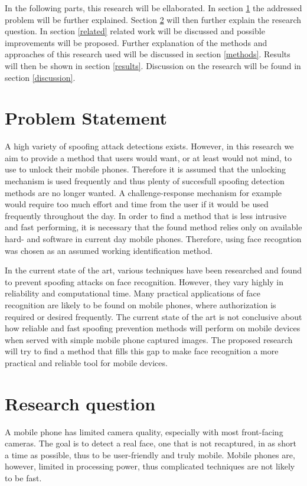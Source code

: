 \documentclass{sig-alternate-br}
\begin{document}
In the following parts, this research will be ellaborated. In section \ref{problem} the addressed problem will be further explained. Section \ref{question} will then further explain the research question. In section \ref{related} related work will be discussed and possible improvements will be proposed. Further explanation of the methods and approaches of this research used will be discussed in section \ref{methods}. Results will then be shown in section \ref{results}. Discussion on the research will be found in section \ref{discussion}.

\section{Problem Statement} \label{problem}
A high variety of spoofing attack detections exists. However, in this research we aim to provide a method that users would want, or at least would not mind, to use to unlock their mobile phones. Therefore it is assumed that the unlocking mechanism is used frequently and thus plenty of succesfull spoofing detection methods are no longer wanted. A challenge-response mechanism for example would require too much effort and time from the user if it would be used frequently throughout the day. In order to find a method that is less intrusive and fast performing, it is necessary that the found method relies only on available hard- and software in current day mobile phones. Therefore, using face recogntion was chosen as an assumed working identification method.

In the current state of the art, various techniques have been researched and found to prevent spoofing attacks on face recognition. However, they vary highly in reliability and computational time. Many practical applications of face recognition are likely to be found on mobile phones, where authorization is required or desired frequently. The current state of the art is not conclusive about how reliable and fast spoofing prevention methods will perform on mobile devices when served with simple mobile phone captured images. The proposed research will try to find a method that fills this gap to make face recognition a more practical and reliable tool for mobile devices.

\section{Research question} \label{question}
A mobile phone has limited camera quality, especially with most front-facing cameras. The goal is to detect a real face, one that is not recaptured, in as short a time as possible, thus to be user-friendly and truly mobile. Mobile phones are, however, limited in processing power, thus complicated techniques are not likely to be fast.
\end{document}
